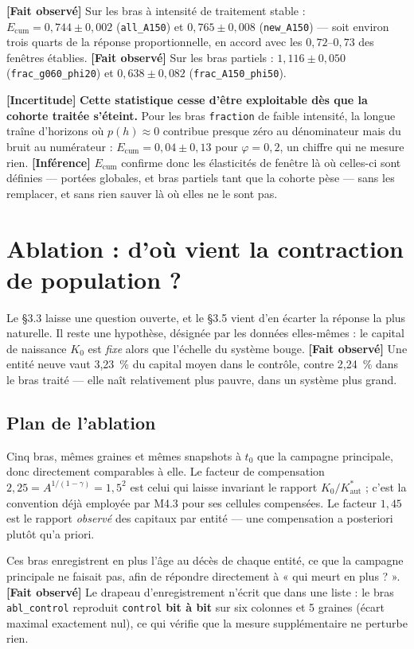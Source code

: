 \documentclass[11pt,a4paper]{article}
\newcommand{\code}[1]{\texttt{#1}}
\newcommand{\Kaut}{K^{*}_{\mathrm{aut}}}
\newcommand{\fait}{\textbf{[Fait observé]}}
\newcommand{\inference}{\textbf{[Inférence]}}
\newcommand{\incertitude}{\textbf{[Incertitude]}}
\begin{document}
\fait{} Sur les bras à intensité de traitement stable :
$E_{\text{cum}} = 0{,}744 \pm 0{,}002$ (\code{all\_A150}) et
$0{,}765 \pm 0{,}008$ (\code{new\_A150}) --- soit environ trois quarts de la
réponse proportionnelle, en accord avec les $0{,}72$--$0{,}73$ des fenêtres
établies. \fait{} Sur les bras partiels : $1{,}116 \pm 0{,}050$
(\code{frac\_g060\_phi20}) et $0{,}638 \pm 0{,}082$
(\code{frac\_A150\_phi50}).

\incertitude{} \textbf{Cette statistique cesse d'être exploitable dès que la
cohorte traitée s'éteint.} Pour les bras \code{fraction} de faible
intensité, la longue traîne d'horizons où $p(h) \approx 0$ contribue
presque zéro au dénominateur mais du bruit au numérateur :
$E_{\text{cum}} = 0{,}04 \pm 0{,}13$ pour $\varphi=0{,}2$, un chiffre qui ne
mesure rien. \inference{} $E_{\text{cum}}$ confirme donc les élasticités de
fenêtre là où celles-ci sont définies --- portées globales, et bras partiels
tant que la cohorte pèse --- sans les remplacer, et sans rien sauver là où
elles ne le sont pas.

\section{Ablation : d'où vient la contraction de population ?}
\label{sec:ablation}

Le §3.3 laisse une question ouverte, et le §3.5 vient d'en écarter la
réponse la plus naturelle. Il reste une hypothèse, désignée par les données
elles-mêmes : le capital de naissance $K_0$ est \emph{fixe} alors que
l'échelle du système bouge. \fait{} Une entité neuve vaut 3,23~\% du capital
moyen dans le contrôle, contre 2,24~\% dans le bras traité --- elle naît
relativement plus pauvre, dans un système plus grand.

\subsection{Plan de l'ablation}

Cinq bras, mêmes graines et mêmes snapshots à $t_0$ que la campagne
principale, donc directement comparables à elle. Le facteur de compensation
$2{,}25 = A^{1/(1-\gamma)} = 1{,}5^{2}$ est celui qui laisse invariant le
rapport $K_0/\Kaut$ ; c'est la convention déjà employée par M4.3 pour ses
cellules compensées. Le facteur $1{,}45$ est le rapport \emph{observé} des
capitaux par entité --- une compensation a posteriori plutôt qu'a priori.

Ces bras enregistrent en plus l'âge au décès de chaque entité, ce que la
campagne principale ne faisait pas, afin de répondre directement à « qui
meurt en plus ? ». \fait{} Le drapeau d'enregistrement n'écrit que dans une
liste : le bras \code{abl\_control} reproduit \code{control} \textbf{bit à
bit} sur six colonnes et 5 graines (écart maximal exactement nul), ce qui
vérifie que la mesure supplémentaire ne perturbe rien.
\end{document}
